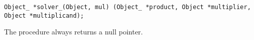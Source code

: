 
\tt{Object_ *solver_(Object, mul)%
(Object_ *product, Object *multiplier, Object *multiplicand);}


The procedure always returns a null pointer.

